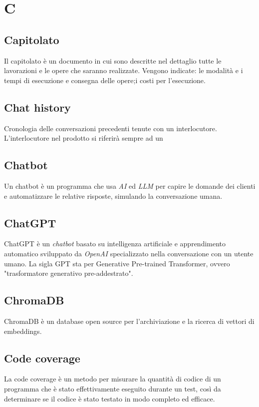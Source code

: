 \chapter{C}

\section{Capitolato}\label{sec:Capitolati}
Il capitolato è un documento in cui sono descritte nel dettaglio tutte le lavorazioni e le opere che saranno realizzate. Vengono indicate: le modalità e i tempi di esecuzione e consegna delle opere;i costi per l'esecuzione.

\section{Chat history}
Cronologia delle conversazioni precedenti tenute con un interlocutore. L'interlocutore nel prodotto si riferirà sempre ad un 

\section{Chatbot}
Un chatbot è un programma che usa \emph{AI} ed \emph{LLM} per capire le domande dei clienti e automatizzare le relative risposte, simulando la conversazione umana.

\section{ChatGPT}
ChatGPT è un \emph{chatbot} basato su intelligenza artificiale e apprendimento automatico sviluppato da \emph{OpenAI} specializzato nella conversazione con un utente umano. La sigla GPT sta per Generative Pre-trained Transformer, ovvero "trasformatore generativo pre-addestrato". 

\section{ChromaDB}\label{sec:Chroma}
ChromaDB è un database open source per l'archiviazione e la ricerca di vettori di embeddings.

\section{Code coverage}
La code coverage è un metodo per misurare la quantità di codice di un programma che è stato effettivamente eseguito durante un test, così da determinare se il codice è stato testato in modo completo ed efficace.

